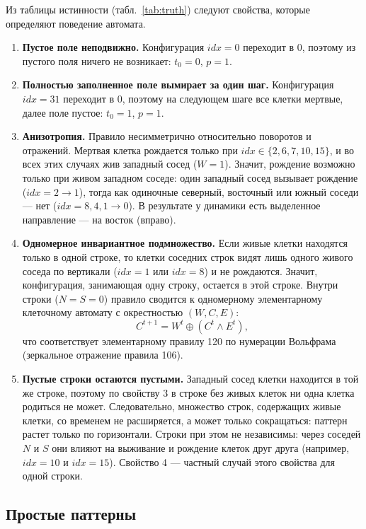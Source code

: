 \documentclass[a4paper,14pt]{extarticle}
\begin{document}
Из таблицы истинности (табл.~\ref{tab:truth}) следуют свойства, которые определяют поведение автомата.
\begin{enumerate}
	\item \textbf{Пустое поле неподвижно.} Конфигурация $idx = 0$ переходит в 0, поэтому из пустого поля ничего не возникает: $t_0 = 0$, $p = 1$.
	\item \textbf{Полностью заполненное поле вымирает за один шаг.} Конфигурация $idx = 31$ переходит в 0, поэтому на следующем шаге все клетки мертвые, далее поле пустое: $t_0 = 1$, $p = 1$.
	\item \textbf{Анизотропия.} Правило несимметрично относительно поворотов и отражений. Мертвая клетка рождается только при $idx \in \{2, 6, 7, 10, 15\}$, и во всех этих случаях жив западный сосед ($W = 1$). Значит, рождение возможно только при живом западном соседе: один западный сосед вызывает рождение ($idx = 2 \to 1$), тогда как одиночные северный, восточный или южный соседи --- нет ($idx = 8, 4, 1 \to 0$). В результате у динамики есть выделенное направление --- на восток (вправо).
	\item \textbf{Одномерное инвариантное подмножество.} Если живые клетки находятся только в одной строке, то клетки соседних строк видят лишь одного живого соседа по вертикали ($idx = 1$ или $idx = 8$) и не рождаются. Значит, конфигурация, занимающая одну строку, остается в этой строке. Внутри строки ($N = S = 0$) правило сводится к одномерному элементарному клеточному автомату с окрестностью $(W, C, E)$:
	\[
		C^{t+1} = W^t \oplus (C^t \wedge E^t),
	\]
	что соответствует элементарному правилу 120 по нумерации Вольфрама (зеркальное отражение правила 106).
	\item \textbf{Пустые строки остаются пустыми.} Западный сосед клетки находится в той же строке, поэтому по свойству 3 в строке без живых клеток ни одна клетка родиться не может. Следовательно, множество строк, содержащих живые клетки, со временем не расширяется, а может только сокращаться: паттерн растет только по горизонтали. Строки при этом не независимы: через соседей $N$ и $S$ они влияют на выживание и рождение клеток друг друга (например, $idx = 10$ и $idx = 15$). Свойство 4 --- частный случай этого свойства для одной строки.
\end{enumerate}

\subsection{Простые паттерны}
\end{document}
